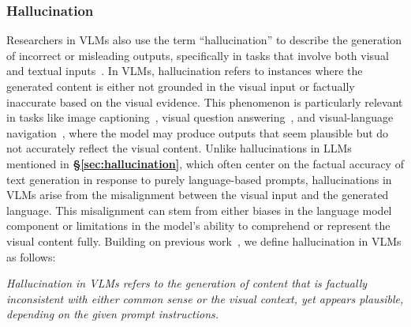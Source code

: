 \subsubsection{Hallucination}
\label{sec:vlmhallucination}
Researchers in VLMs also use the term ``hallucination'' to describe the generation of incorrect or misleading outputs, specifically in tasks that involve both visual and textual inputs~\cite{HallusionBench, rani2024visualhallucinationdefinitionquantification,huang2024visual}. In VLMs, hallucination refers to instances where the generated content is either not grounded in the visual input or factually inaccurate based on the visual evidence. This phenomenon is particularly relevant in tasks like image captioning~\cite{rohrbach2018object, biten2022let}, visual question answering~\cite{yue2024mmmu, liu2023mmbench, yu2024mmvet, HallusionBench}, and visual-language navigation~\cite{Dorbala2022CLIPNavUC, guan2024loczson, shah2023vint, elnoor2024robotnav}, where the model may produce outputs that seem plausible but do not accurately reflect the visual content. Unlike hallucinations in LLMs mentioned in \textbf{\S\ref{sec:hallucination}}, which often center on the factual accuracy of text generation in response to purely language-based prompts, hallucinations in VLMs arise from the misalignment between the visual input and the generated language. This misalignment can stem from either biases in the language model component or limitations in the model's ability to comprehend or represent the visual content fully. Building on previous work~\cite{HallusionBench, rani2024visualhallucinationdefinitionquantification, xu2024hallucination,huang2024visual}, we define hallucination in VLMs as follows:

\begin{tcolorbox}[definition]
\textit{Hallucination in VLMs refers to the generation of content that is factually inconsistent with either common sense or the visual context, yet appears plausible, depending on the given prompt instructions.}
\end{tcolorbox}

